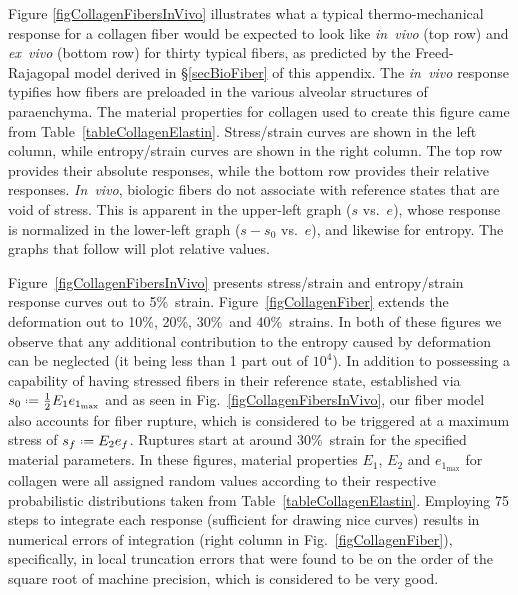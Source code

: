 Figure \ref{figCollagenFibersInVivo} illustrates what a typical thermo-mechanical response for a collagen fiber would be expected to look like \textit{in~vivo\/} (top row) and \textit{ex~vivo\/} (bottom row) for thirty typical fibers, as predicted by the Freed-Rajagopal \cite{FreedRajagopal16} model derived in \S\ref{secBioFiber} of this appendix.  The \textit{in~vivo\/} response typifies how fibers are preloaded in the various alveolar structures of paraenchyma.  The material properties for collagen used to create this figure came from Table~\ref{tableCollagenElastin}. Stress\slash strain curves are shown in the left column, while entropy\slash strain curves are shown in the right column.  The top row provides their absolute responses, while the bottom row provides their relative responses.  \textit{In~vivo}, biologic fibers do not associate with reference states that are void of stress.  This is apparent in the upper-left graph ($s$ vs.\ $e$), whose response is normalized in the lower-left graph ($s \! - \! s_0$ vs.\ $e$), and likewise for entropy.  The graphs that follow will plot relative values.

Figure~\ref{figCollagenFibersInVivo} presents stress\slash strain and entropy\slash strain response curves out to 5\%\ strain.  Figure~\ref{figCollagenFiber} extends the deformation out to 10\%, 20\%, 30\%\ and 40\%\ strains.  In both of these figures we observe that any additional contribution to the entropy caused by deformation can be neglected (it being less than 1 part out of $10^4$).  In addition to possessing a capability of having stressed fibers in their reference state, established via $s_0 \defeq \tfrac{1}{2} E_1 e_{1_{\max}}$ and as seen in Fig.~\ref{figCollagenFibersInVivo}, our fiber model also accounts for fiber rupture, which is considered to be triggered at a maximum stress of $s_f \defeq E_2 e_f$.  Ruptures start at around 30\%\ strain for the specified material parameters.  In these figures, material properties  $E_1$, $E_2$ and $e_{1_{\max}}$ for collagen were all assigned random values according to their respective probabilistic distributions taken from Table~\ref{tableCollagenElastin}.  Employing 75 steps to integrate each response (sufficient for drawing nice curves) results in numerical errors of integration (right column in Fig.~\ref{figCollagenFiber}), specifically, in local truncation errors that were found to be on the order of the square root of machine precision, which is considered to be very good.

